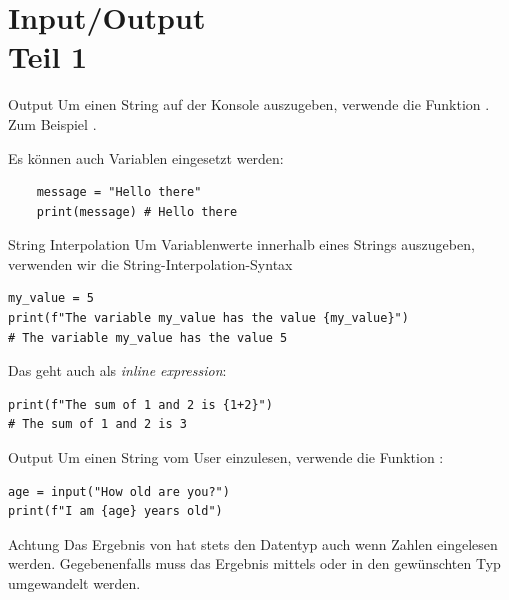 \section{Input/Output \\ \footnotesize Teil 1}

\begin{fragile}[]

\begin{block}{Output}
	\vspace{2pt}
	Um einen String auf der Konsole auszugeben, verwende die Funktion . 
	Zum Beispiel . 
	
	Es können auch Variablen eingesetzt werden: 
	\begin{verbatim}
	message = "Hello there"
	print(message) # Hello there
	\end{verbatim}
	
	\end{block}
	
\end{fragile}

\begin{fragile}[]
	
\begin{block}{String Interpolation}
\vspace{2pt}
Um Variablenwerte innerhalb eines Strings auszugeben, verwenden wir die String-Interpolation-Syntax
\begin{verbatim}
my_value = 5
print(f"The variable my_value has the value {my_value}")
# The variable my_value has the value 5
\end{verbatim}

Das geht auch als \textit{inline expression}: 
\begin{verbatim}
print(f"The sum of 1 and 2 is {1+2}")
# The sum of 1 and 2 is 3
\end{verbatim}

\end{block}
	
\end{fragile}

\begin{fragile}
\begin{block}{Output}
	\vspace{2pt}
Um einen String vom User einzulesen, verwende die Funktion :
\begin{verbatim}
age = input("How old are you?")
print(f"I am {age} years old")
\end{verbatim}
\end{block}

\begin{alertblock}{Achtung}
	\vspace{2pt}
Das Ergebnis von  hat stets den Datentyp  auch wenn Zahlen eingelesen werden. Gegebenenfalls muss das Ergebnis mittels  oder  in den gewünschten Typ umgewandelt werden. 	
\end{alertblock}

\end{fragile}

